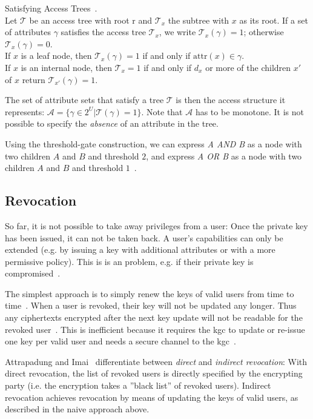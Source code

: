 \begin{definition}
    Satisfying Access Trees~\cite{goyal_attribute-based_2006}.\\
    Let $\mathcal{T}$ be an access tree with root r and $\mathcal{T}_x$ the subtree with $x$ as its root.
    If a set of attributes $\gamma$ satisfies the access tree $\mathcal{T}_x$, we write $\mathcal{T}_x(\gamma) = 1$; otherwise $\mathcal{T}_x(\gamma) = 0$.\\
    If $x$ is a leaf node, then $\mathcal{T}_x(\gamma) = 1$ if and only if $\text{attr}(x) \in \gamma$.\\
    If $x$ is an internal node, then $\mathcal{T}_x = 1$ if and only if $d_x$ or more of the children $x'$ of $x$ return $\mathcal{T}_{x'}(\gamma) = 1$.
\end{definition}
The set of attribute sets that satisfy a tree $\mathcal{T}$ is then the access structure it represents: $\mathcal{A} = \{\gamma \in 2^U | \mathcal{T}(\gamma) = 1\}$.
Note that $\mathcal{A}$ has to be monotone. It is not possible to specify the \emph{absence} of an attribute in the tree.

Using the threshold-gate construction, we can express \emph{A AND B} as a node with two children $A$ and $B$ and threshold $2$, and express \emph{A OR B} as a node with two children $A$ and $B$ and threshold $1$~\cite{yao_lightweight_2015}.

\subsection{Revocation}
So far, it is not possible to take away privileges from a user:
Once the private key has been issued, it can not be taken back.
A user's capabilities can only be extended (e.g. by issuing a key with additional attributes or with a more permissive policy).
This is is an problem, e.g. if their private key is compromised~\cite{boldyreva_identity-based_2008}.

The simplest approach is to simply renew the keys of valid users from time to time~\cite{boldyreva_identity-based_2008}.
When a user is revoked, their key will not be updated any longer. Thus any ciphertexts encrypted after the next key update will not be readable for the revoked user~\cite{boldyreva_identity-based_2008}.
This is inefficient because it requires the \acrshort{kgc} to update or re-issue one key per valid user and needs a secure channel to the \acrshort{kgc}~\cite{boldyreva_identity-based_2008}.

Attrapadung and Imai~\cite{attrapadung_attribute-based_2009} differentiate between \emph{direct} and \emph{indirect revocation}: 
With direct revocation, the list of revoked users is directly specified by the encrypting party (i.e. the encryption takes a ''black list'' of revoked users).
Indirect revocation achieves revocation by means of updating the keys of valid users, as described in the naive approach above.

